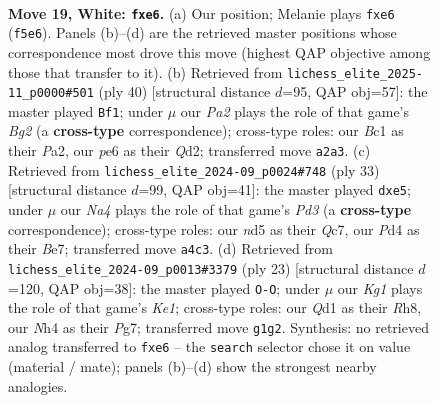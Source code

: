 \documentclass[11pt]{article}
\begin{document}
\clearpage

\begin{figure}[p]\centering
\begin{subfigure}{0.46\textwidth}\centering
\resizebox{\linewidth}{!}{%
\newchessgame
\chessboard[
  setfen={r6r/p2nkp1p/2pbp1p1/1q1n1PP1/Np1P3N/4P2P/PP6/R1BQ1RK1 w - - 0 19},
  showmover=false,
  pgfstyle=straightmove, color=movearrow, markmove={f5-e6}
]}
\caption{}
\end{subfigure}\hfill
\begin{subfigure}{0.46\textwidth}\centering
\resizebox{\linewidth}{!}{%
\newchessgame
\chessboard[
  setfen={1r2r1k1/5pbp/p1pp2p1/2n1pP2/2qnP1PP/2N1B3/PP1Q1RB1/R5K1 w - - 0 21},
  showmover=false,
  pgfstyle=straightmove, color=movearrow, markmove={g2-f1}
]}
\caption{}
\end{subfigure}
\\[4pt]
\begin{subfigure}{0.46\textwidth}\centering
\resizebox{\linewidth}{!}{%
\newchessgame
\chessboard[
  setfen={2r1k2r/2q1bp2/p2ppn1p/1pn1P1p1/3N1PP1/P1N5/1PP3QP/1K1RB2R b k - 0 17},
  showmover=false,
  pgfstyle=straightmove, color=movearrow, markmove={d6-e5}
]}
\caption{}
\end{subfigure}\hfill
\begin{subfigure}{0.46\textwidth}\centering
\resizebox{\linewidth}{!}{%
\newchessgame
\chessboard[
  setfen={r2qk2r/1p3ppp/n1pb1n2/3pNp2/2PP1P2/pPB1P3/P5PP/RN1Q1RK1 b kq - 0 12},
  showmover=false,
  pgfstyle=straightmove, color=movearrow, markmove={e8-g8}
]}
\caption{}
\end{subfigure}
\caption{\textbf{Move 19, White: \texttt{fxe6}.} (a) Our position; Melanie plays \texttt{fxe6} (\texttt{f5e6}). Panels (b)--(d) are the retrieved master positions whose correspondence most drove this move (highest QAP objective among those that transfer to it). (b) Retrieved from \texttt{lichess\_elite\_2025-11\_p0000\#501} (ply 40) [structural distance $d$=95, QAP obj=57]: the master played \texttt{Bf1}; under $\mu$ our \emph{Pa2} plays the role of that game's \emph{Bg2} (a \textbf{cross-type} correspondence); cross-type roles: our \emph{B}c1 as their \emph{P}a2, our \emph{p}e6 as their \emph{Q}d2; transferred move \texttt{a2a3}. (c) Retrieved from \texttt{lichess\_elite\_2024-09\_p0024\#748} (ply 33) [structural distance $d$=99, QAP obj=41]: the master played \texttt{dxe5}; under $\mu$ our \emph{Na4} plays the role of that game's \emph{Pd3} (a \textbf{cross-type} correspondence); cross-type roles: our \emph{n}d5 as their \emph{Q}c7, our \emph{P}d4 as their \emph{B}e7; transferred move \texttt{a4c3}. (d) Retrieved from \texttt{lichess\_elite\_2024-09\_p0013\#3379} (ply 23) [structural distance $d$=120, QAP obj=38]: the master played \texttt{O-O}; under $\mu$ our \emph{Kg1} plays the role of that game's \emph{Ke1}; cross-type roles: our \emph{Q}d1 as their \emph{R}h8, our \emph{N}h4 as their \emph{P}g7; transferred move \texttt{g1g2}. Synthesis: no retrieved analog transferred to \texttt{fxe6} -- the \texttt{search} selector chose it on value (material / mate); panels (b)--(d) show the strongest nearby analogies.}
\label{fig:thought-m36}
\end{figure}
\end{document}
